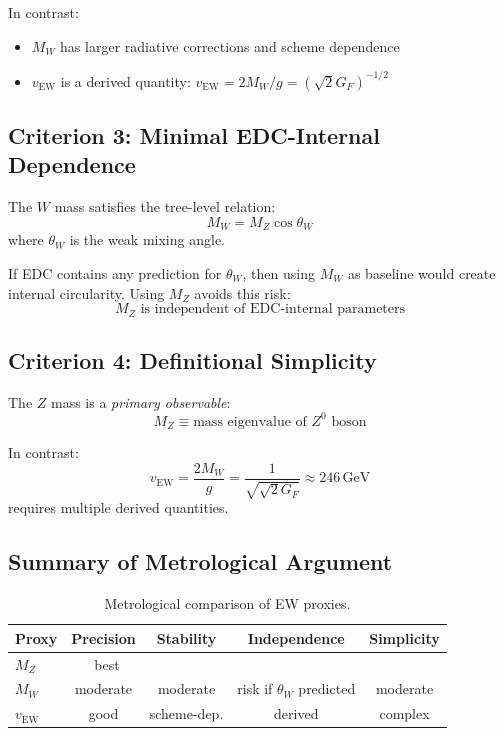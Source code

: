 \documentclass[11pt,a4paper]{article}
\newcommand{\MZ}{M_Z}
\newcommand{\MW}{M_W}
\newcommand{\vEW}{v_{\mathrm{EW}}}
\newcommand{\GeV}{\,\mathrm{GeV}}
\newcommand{\emark}{\textcolor{green!70!black}{\checkmark}}
\theoremstyle{definition}
\theoremstyle{plain}
\theoremstyle{remark}
\begin{document}
In contrast:
\begin{itemize}
\item $\MW$ has larger radiative corrections and scheme dependence
\item $\vEW$ is a derived quantity: $\vEW = 2\MW/g = (\sqrt{2}G_F)^{-1/2}$
\end{itemize}

\subsection{Criterion 3: Minimal EDC-Internal Dependence}

The $W$ mass satisfies the tree-level relation:
\begin{equation}
\MW = \MZ \cos\theta_W
\label{eq:MW-tree}
\end{equation}
where $\theta_W$ is the weak mixing angle.

If EDC contains any prediction for $\theta_W$, then using $\MW$ as baseline
would create internal circularity. Using $\MZ$ avoids this risk:
\begin{equation}
\MZ \text{ is independent of EDC-internal parameters}
\label{eq:MZ-independence}
\end{equation}

\subsection{Criterion 4: Definitional Simplicity}

The $Z$ mass is a \emph{primary observable}:
\begin{equation}
\MZ \equiv \text{mass eigenvalue of }Z^0\text{ boson}
\label{eq:MZ-definition}
\end{equation}

In contrast:
\begin{equation}
\vEW = \frac{2\MW}{g} = \frac{1}{\sqrt{\sqrt{2}G_F}} \approx 246\GeV
\label{eq:vEW-definition}
\end{equation}
requires multiple derived quantities.

\subsection{Summary of Metrological Argument}

\begin{table}[htbp]
\centering
\caption{Metrological comparison of EW proxies.}
\label{tab:metrological}
\begin{tabular}{@{}lcccc@{}}
\toprule
Proxy & Precision & Stability & Independence & Simplicity \\
\midrule
$\MZ$ & \emark\ best & \emark\ & \emark\ & \emark\ \\
$\MW$ & moderate & moderate & risk if $\theta_W$ predicted & moderate \\
$\vEW$ & good & scheme-dep. & derived & complex \\
\bottomrule
\end{tabular}
\end{table}
\end{document}
